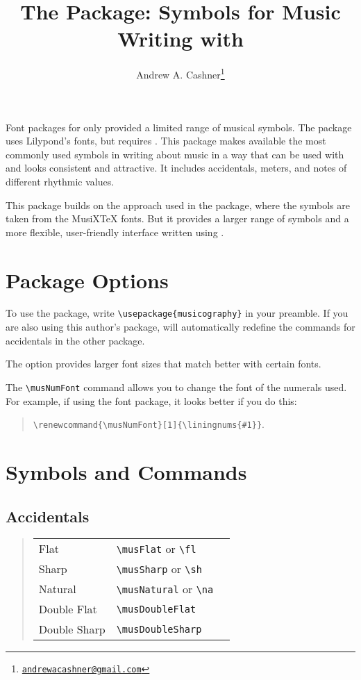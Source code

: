 \documentclass{article}
\title{The \code{musicography} Package: Symbols for Music Writing with
\code{pdflatex}}
\author{Andrew A. Cashner\thanks{%
    \href{mailto:andrewacashner@gmail.com}
    {\nolinkurl{andrewacashner@gmail.com}}%
    }%
}
\newenvironment{codetable}
{\begin{quote}\begin{tabular}{lll}}
{\end{tabular}\end{quote}}
\begin{document}
\maketitle

Font packages for  only provided a limited range of musical
symbols. 
The  package uses Lilypond's fonts, but requires
. 
This package makes available the most commonly used symbols in writing about
music in a way that can be used with  and looks consistent and
attractive.
It includes accidentals, meters, and notes of different rhythmic values.

This package builds on the approach used in the  package, where
the symbols are taken from the MusiXTeX fonts.
But it provides a larger range of symbols and a more flexible, user-friendly
interface written using .

\tableofcontents

\section{Package Options}

To use the package, write \verb|\usepackage{musicography}| in your preamble.
If you are also using this author's  package, 
 will automatically redefine the commands for accidentals in
the other package.

The  option provides larger font sizes that match better with
certain fonts.

The \verb|\musNumFont| command allows you to change the font of the numerals
used.
For example, if using the  font package, it looks better if you
do this: 
\begin{quote}
    \verb|\renewcommand{\musNumFont}[1]{\liningnums{#1}}|.
\end{quote}

\section{Symbols and Commands}

\subsection{Accidentals}

\begin{codetable}
    Flat & \verb|\musFlat| or \verb|\fl| & \musFlat\\
    Sharp & \verb|\musSharp| or \verb|\sh| & \musSharp\\
    Natural & \verb|\musNatural| or \verb|\na| & \musNatural\\
    Double Flat & \verb|\musDoubleFlat| & \musDoubleFlat\\
    Double Sharp & \verb|\musDoubleSharp| & \musDoubleSharp\\
\end{codetable}
\end{document}

